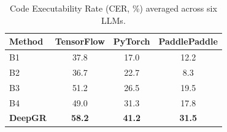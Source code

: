 \begin{table}[t]
    \caption{Code Executability Rate (CER, \%) averaged
    across six LLMs.}
    \label{tab:cer}
    \centering
    \small
    \setlength{\tabcolsep}{5pt}
    \begin{tabular}{lccc}
    \toprule
    Method & TensorFlow & PyTorch & PaddlePaddle \\
    \midrule
    B1 & 37.8 & 17.0 & 12.2 \\
    B2 & 36.7 & 22.7 & 8.3 \\
    B3 & 51.2 & 26.5 & 19.5 \\
    B4 & 49.0 & 31.3 & 17.8 \\
    \textbf{DeepGR}
    & \textbf{58.2} & \textbf{41.2} & \textbf{31.5} \\
    \bottomrule
    \end{tabular}
\end{table}